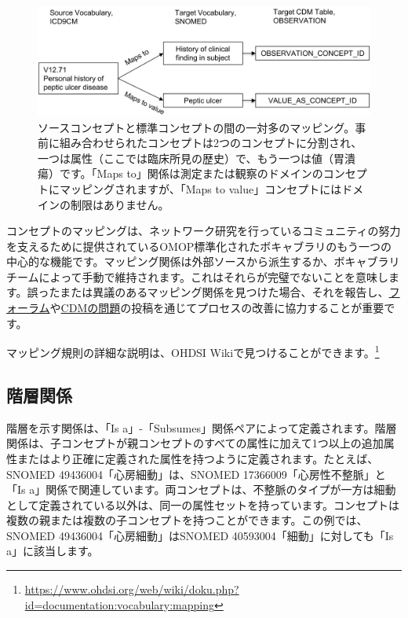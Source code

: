 \documentclass[
  11pt]{book}
\theoremstyle{definition}
\theoremstyle{definition}
\theoremstyle{definition}
\theoremstyle{definition}
\theoremstyle{remark}
\begin{document}
\begin{figure}

{\centering \includegraphics[width=1\linewidth]{images/StandardizedVocabularies/conceptValue} 

}

\caption{ソースコンセプトと標準コンセプトの間の一対多のマッピング。事前に組み合わせられたコンセプトは2つのコンセプトに分割され、一つは属性（ここでは臨床所見の歴史）で、もう一つは値（胃潰瘍）です。「Maps to」関係は測定または観察のドメインのコンセプトにマッピングされますが、「Maps to value」コンセプトにはドメインの制限はありません。}\label{fig:conceptValue}
\end{figure}

コンセプトのマッピングは、ネットワーク研究を行っているコミュニティの努力を支えるために提供されているOMOP標準化されたボキャブラリのもう一つの中心的な機能です。マッピング関係は外部ソースから派生するか、ボキャブラリチームによって手動で維持されます。これはそれらが完璧でないことを意味します。誤ったまたは異議のあるマッピング関係を見つけた場合、それを報告し、\href{https://forums.ohdsi.org}{フォーラム}や\href{https://github.com/OHDSI/CommonDataModel/issues}{CDMの問題}の投稿を通じてプロセスの改善に協力することが重要です。

マッピング規則の詳細な説明は、OHDSI Wikiで見つけることができます。\footnote{\url{https://www.ohdsi.org/web/wiki/doku.php?id=documentation:vocabulary:mapping}}

\subsection{階層関係}\label{ux968eux5c64ux95a2ux4fc2}

階層を示す関係は、「Is a」-「Subsumes」関係ペアによって定義されます。階層関係は、子コンセプトが親コンセプトのすべての属性に加えて1つ以上の追加属性またはより正確に定義された属性を持つように定義されます。たとえば、SNOMED 49436004「心房細動」は、SNOMED 17366009「心房性不整脈」と「Is a」関係で関連しています。両コンセプトは、不整脈のタイプが一方は細動として定義されている以外は、同一の属性セットを持っています。コンセプトは複数の親または複数の子コンセプトを持つことができます。この例では、SNOMED 49436004「心房細動」はSNOMED 40593004「細動」に対しても「Is a」に該当します。
\end{document}
